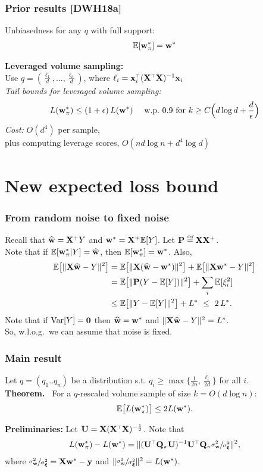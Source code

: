 \documentclass{beamer}
\begin{document}
\begin{frame}
\frametitle{Prior results [DWH18a]}
Unbiasedness for any $q$ with full support:
\begin{align*}
\mathbb E[\mathbf w_\pi^*] = \mathbf w^*
\end{align*}

\textbf{Leveraged volume sampling:}\\
Use $q = (\frac{\ell_1}{d},...,\frac{\ell_n}{d})$, where $\ell_i=\x_i^\top(\X^\top\X)^{-1}\x_i$\\[4mm]
\textit{Tail bounds for leveraged volume sampling:}
\begin{align*}
L(\mathbf w_\pi^*)\leq (1+\epsilon)\,L(\mathbf w^*)\quad\text{ w.p.~$0.9$ for }k\geq C\Big(d\log d + \frac{d}{\epsilon}\Big)
\end{align*}
\textit{Cost:} $O(d^4)$ per sample, \\
plus computing leverage scores, $O(nd\log n + d^4\log d)$\\[3mm]
\end{frame}


\section{New expected loss bound}

\begin{frame}
  \frametitle{From random noise to fixed noise}
  Recall that $\widehat{\mathbf w}=\mathbf X^+Y$ and $\mathbf w^*=\mathbf X^+\mathbb E[Y]$. Let
  $\mathbf P\stackrel{\textit{\tiny{def}}}{=}\mathbf X\mathbf X^+$.\\
  Note that if $\mathbb E[\mathbf w_\pi^*|Y]=\widehat{\mathbf w}$, then $\mathbb E[\mathbf w_\pi^*] = \mathbf w^*$. Also,
  \begin{align*}
    \mathbb E\big[\|\mathbf X\widehat{\mathbf w}-Y\|^2\big]
    &= \mathbb E\big[\|\mathbf X(\widehat{\mathbf w}-\mathbf w^*)\|^2\big] +
    \mathbb E\big[\|\mathbf X\mathbf w^*-Y\|^2\big] \\
&= \mathbb E\big[\|\mathbf P(Y-\mathbb E[Y])\|^2\big] + \sum_i\mathbb E[\xi_i^2]\\
    &\leq \mathbb E\big[\|Y-\mathbb E[Y]\|^2\big]+ L^*\ \leq\ 2\,L^*.
  \end{align*}
  Note that if $\mathrm{Var}[Y]=\mathbf 0$ then $\widehat{\mathbf w}=\mathbf w^*$ and $\|\mathbf X\widehat{\mathbf w}-Y\|^2=L^*$.\\
  So, w.l.o.g.~we can assume that noise is fixed.
\end{frame}

\begin{frame}
  \frametitle{Main result}
  Let $q =(q_1..q_n)$ be a distribution s.t. $q_i\geq
  \max\{\frac1{2n},\frac{\ell_i}{2d}\}$ for all $i$.\\ [5mm]
  \textbf{Theorem.} \ 
For a $q$-rescaled volume sample of size $k=O(d \log n)$:
  \begin{align*}
    \mathbb E\big[L(\mathbf w_\pi^*)\big] \leq 2 L(\mathbf w^*).
  \end{align*}
  \vspace{8mm}
  
  \textbf{Preliminaries:} Let $\U = \X(\X^\top\X)^{-\frac12}$. Note
  that
  \begin{align*}
    L(\w_\pi^*) - L(\w^*) = \|(\U^\top\Q_\pi\U)^{-1}\U^\top\Q_\pi\r\|^2,
  \end{align*}
  where $\sfrac{\sigma_{\mathbf w}^2}{\sigma_{\boldsymbol\xi}^2}=\mathbf X\mathbf w^*-\mathbf y$ and $\|\sfrac{\sigma_{\mathbf w}^2}{\sigma_{\boldsymbol\xi}^2}\|^2=L(\mathbf w^*)$.
\end{frame}
\end{document}
